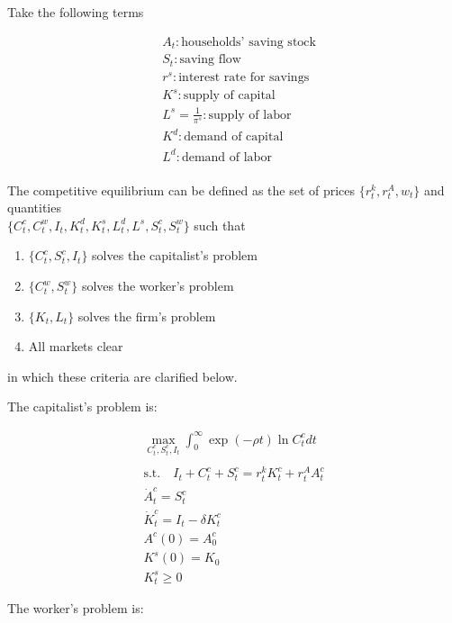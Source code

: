 
Take the following terms

\begin{align}
    &A_t: \text{households' saving stock} \\
    &S_t: \text{saving flow} \\
    &r^s: \text{interest rate for savings} \\
    &K^s: \text{supply of capital} \\
    &L^s = \frac{1}{\pi^s}: \text{supply of labor} \\
    &K^d: \text{demand of capital} \\
    &L^d: \text{demand of labor} \\
\end{align}

The competitive equilibrium can be defined as the 
set of prices $\{r^k_t, r^A_t, w_t\}$ and quantities \\
$\{C^c_t, C^w_t, I_t, K^d_t, K^s_t, L_t^d, L^s, S_t^c, S_t^w\}$ such that

\begin{enumerate}
    \item $\{C_t^c, S_t^c, I_t\}$ solves the capitalist's problem
    \item $\{C_t^w, S_t^w\}$ solves the worker's problem
    \item $\{K_t, L_t\}$ solves the firm's problem
    \item All markets clear
\end{enumerate}

in which these criteria are clarified below.

The capitalist's problem is:

\begin{align}
    \underset{C^c_t, S^c_t, I_t}{\max} \int_0^{\infty} \exp (-\rho t) \ln C_t^c d t \\
    \quad \\
    \text{s.t.} \quad I_t + C_t^c + S_t^c = r_t^k K_t^c+ r_t^A A_t^c \label{eq:pset_2023_24_ps2_q1_golosov_cp_bc1} \\
    \dot{A}_t^c = S_t^c \\
    \dot{K}_t^c = I_t - \delta K_t^c \label{eq:pset_2023_24_ps2_q1_golosov_cp_kdot} \\
    A^c(0) = A^c_0 \\
    K^s(0) = K_0 \\
    K_t^s \geq 0
\end{align}

The worker's problem is:

